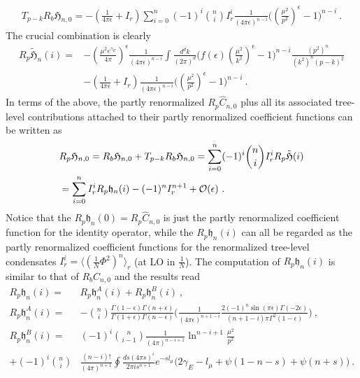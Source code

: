 \documentclass[a4paper,11pt]{article}
\begin{document}
\begin{align}
T_{p-k}R_b\mathfrak{H}_{n,0}=-\left(\frac{1}{4\pi \epsilon}+I_r\right)\sum_{i=0}^{n}(-1)^i\binom{n}{i}I_r^i \frac{1}{(4\pi\epsilon)^{n-i}}\bigg(\left(\frac{\mu^2}{p^2}\right)^{\epsilon}-1\bigg)^{n-i} \ .
\end{align}
The crucial combination is clearly
\begin{align}
R_p\mathfrak{\tilde H}_{n}(i)=&-\left(\frac{\mu^2 e^{\gamma_E}}{4\pi}\right)^{\epsilon}\frac{1}{(4\pi \epsilon)^{n-i}}\int \frac{d^dk}{(2\pi)^d}\bigg(f(\epsilon)\left(\frac{\mu^2}{k^2}\right)^{\epsilon}-1\bigg)^{n-i}\frac{(p^2)^n}{(k^2)^n(p-k)^2} \nonumber \\ 
&-\left(\frac{1}{4\pi \epsilon}+I_r\right)\frac{1}{(4\pi\epsilon)^{n-i}}\bigg(\left(\frac{\mu^2}{p^2}\right)^{\epsilon}-1\bigg)^{n-i} \ .
\end{align}
In terms of the above, the partly renormalized $R_p\hat C_{n,0}$ plus all its associated tree-level contributions attached to their partly renormalized coefficient functions can be written as
\begin{align}
&R_p\mathfrak{H}_{n,0}=R_b\mathfrak{H}_{n,0}+T_{p-k}R_b\mathfrak{H}_{n,0}=\nonumber \sum_{i=0}^{n}(-1)^i\binom{n}{i}I_r^iR_p\mathfrak{\tilde H}(i) \\ 
&=\sum_{i=0}^{n}I_r^iR_p\mathfrak{h}_n(i)-(-1)^nI_r^{n+1} +{\cal O}(\epsilon)\ .
\end{align}
Notice that the $R_p\mathfrak{h}_n(0)=R_p\hat C_{n,0}$ is just the partly renormalized coefficient function for the identity operator, while the $R_p\mathfrak{h}_n(i)$ can all be regarded as the partly renormalized coefficient functions for the renormalized tree-level condensates $I_r^i=\langle\left(\frac{1}{N}\Phi^2\right)^n\rangle_r$ (at LO in $\frac{1}{N}$). The computation of $R_p\mathfrak{h}_n(i)$ is similar to that of $R_bC_{n,0}$ and the results read
\begin{align}
R_p\mathfrak{h}_n(i)=&R_p\mathfrak{h}^A_n(i)+R_p\mathfrak{h}^B_n(i) \ , \\ 
R_p\mathfrak{h}^A_n(i)=&-\binom{n}{i}\frac{\Gamma(1-\epsilon)\Gamma(n+\epsilon)}{\Gamma(1+\epsilon)\Gamma(n-\epsilon)}\bigg(\frac{1}{(4\pi \epsilon)^{n+1-i}}\frac{2 (-1)^n \sin (\pi  \epsilon) \Gamma (-2 \epsilon)}{(n+1-i)\pi \Gamma^2 (1-\epsilon)}\bigg) \ , \\ 
R_p\mathfrak{h}^B_n(i)=&(-1)^i\binom{n}{i-1}\frac{1}{(4\pi)^{n-i+1}}\ln ^{n-i+1}\frac{\mu^2}{p^2}\nonumber \\ 
+(-1)^i\binom{n}{i}&\frac{(n-i)!}{(4\pi)^{n+1}}\oint\frac{ds (4\pi s)^i}{2\pi i s^{n+1}}e^{-sl_{\mu}}\bigg(2\gamma_E-l_{\mu}+\psi(1-n-s)+\psi(n+s)\bigg) \ .
\end{align}
\end{document}
